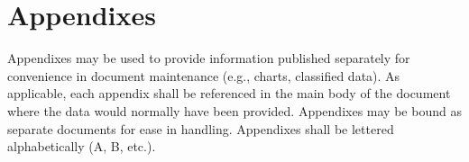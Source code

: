 \documentclass{fidata-report-template}
\begin{document}
\appendix

\section{Appendixes}

Appendixes may be used to provide information published separately for
convenience in document maintenance (e.g., charts, classified data). As
applicable, each appendix shall be referenced in the main body of the
document where the data would normally have been provided. Appendixes
may be bound as separate documents for ease in handling. Appendixes
shall be lettered alphabetically (A, B, etc.).
\end{document}
